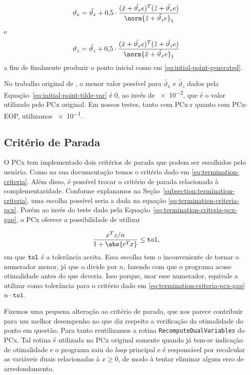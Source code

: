 \begin{equation}
	\label{eq:initial-point-var-x}
\vartheta_{x} = \tilde{\vartheta_x} + \num{0.5}\cdot\dfrac{(\xtil+\tilde{\vartheta_x} e)^{T}(\ztil+\tilde{\vartheta_z} e)}{\norm{\ztil+\tilde{\vartheta_z} e}_{1}} 
\end{equation}
e
\begin{equation}
	\label{eq:initial-point-var-z}
\vartheta_{z} = \tilde{\vartheta_z} + \num{0.5}\cdot\dfrac{(\xtil+\tilde{\vartheta_x} e)^{T}(\ztil+\tilde{\vartheta_z} e)}{\norm{\xtil+\tilde{\vartheta_x} e}_{1}} 
\end{equation}
a fim de finalmente produzir o ponto inicial como em \eqref{eq:intial-point-generated}.

No trabalho original de \textcite{Mehrotra:1992wr}, o menor valor possível para  $\tilde{\vartheta_x}$ e $\tilde{\vartheta_z}$ dados pela Equação~\eqref{eq:initial-point-tilde-var} é $\num{0}$, ao invés de \num{e-2}, 	que é o valor utilizado pelo PCx original. Em nossos testes, tanto com PCx-r quanto com PCx-EOP, utilizamos \num{e-1}. 


\subsection{Critério de Parada}


O PCx tem implementado dois critérios de parada que podem ser escolhidos pelo usuário. Como na sua   documentação temos o critério dado em \eqref{eq:termination-criteria}.   Além disso, é possível trocar o critério de parada relacionado à complementaridade. Conforme explanamos na Seção~\ref{subsection:termination-criteria}, uma escolha possível seria a dada na equação \eqref{eq:termination-criteria-pcx}. Porém ao invés do teste dado pela Equação~\eqref{eq:termination-criteria-pcx-gap}, o PCx oferece a possibilidade de utilizar

\[
\dfrac{x^{T}z/n}{1 + \abs{c^Tx}}\leq
	\tol,
\]
em que $\mathtt{tol}$ é a tolerância aceita. Essa escolha tem o inconveniente de tornar o numerador menor, já que o divide por $n$, fazendo com que o programa acuse otimalidade  antes do que deveria. Isso porque, usar esse numerador, equivale a utilizar como tolerância para o critério dado em \eqref{eq:termination-criteria-pcx-gap} $n\cdot\mathtt{tol}$. 

Fizemos uma pequena alteração ao critério de parada, que nos parece  contribuir para um melhor desempenho  no que diz respeito a verificação da otimalidade do ponto em questão. Para tanto reutilizamos a rotina \verb|RecomputeDualVariables| do PCx. Tal rotina  é utilizada no PCx original somente quando já tem-se indicação de otimalidade e o programa saiu do \emph{loop} principal e é responsável por recalcular as variáveis duais relacionadas à  $x\geq0$, de modo à tentar eliminar algum erro de arredondamento.

